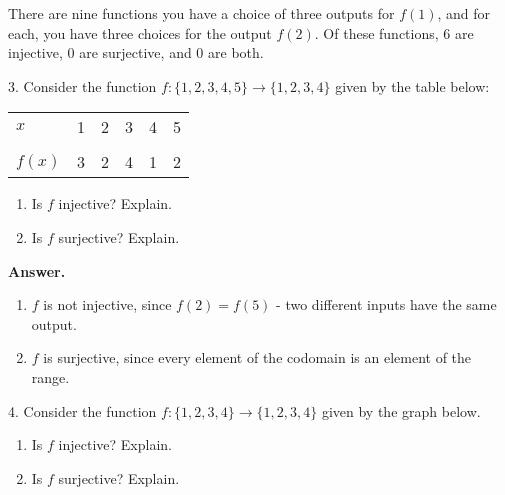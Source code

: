 \documentclass[10pt,]{book}
\theoremstyle{plain}
\theoremstyle{definition}
\theoremstyle{definition}
\theoremstyle{definition}
\numberwithin{equation}{section}
\newcommand{\hrulethin}  {\noalign{\hrule height 0.04em}}
\begin{document}
\begin{exerciselist}
There are nine functions \textendash{} you have a choice of three outputs for \(f(1)\), and for each, you have three choices for the output \(f(2)\). Of these functions, 6 are injective, 0 are surjective, and 0 are both.
%
\item[3.]\hypertarget{exercise-19}{}
Consider the function \(f:\{1,2,3,4,5\} \to \{1,2,3,4\}\) given by the table below:
%
\begin{tabular}{llllll}
\(x\)&1&2&3&4&5\tabularnewline[0pt]
&&&&&\tabularnewline\hrulethin
\(f(x)\)&3&2&4&1&2
\end{tabular}
\leavevmode%
\begin{enumerate}[label=(\alph*)]
\item\hypertarget{li-137}{}
Is \(f\) injective?  Explain.
%
\item\hypertarget{li-138}{}
Is \(f\) surjective?  Explain.
%
\end{enumerate}
\par\smallskip
\par\smallskip
\noindent\textbf{Answer.}\hypertarget{answer-19}{}\quad
\leavevmode%
\begin{enumerate}[label=(\alph*)]
\item\hypertarget{li-139}{}\(f\) is not injective, since \(f(2) = f(5)\) - two different inputs have the same output.\item\hypertarget{li-140}{}\(f\) is surjective, since every element of the codomain is an element of the range.\end{enumerate}
\item[4.]\hypertarget{exercise-20}{}
Consider the function \(f:\{1,2,3,4\} \to \{1,2,3,4\}\) given by the graph below.
%
{
}
\leavevmode%
\begin{enumerate}[label=(\alph*)]
\item\hypertarget{li-141}{}
Is \(f\) injective?  Explain.
%
\item\hypertarget{li-142}{}
Is \(f\) surjective?  Explain.
%
\end{enumerate}
\par\smallskip
\par\smallskip

\end{exerciselist}
\end{document}
